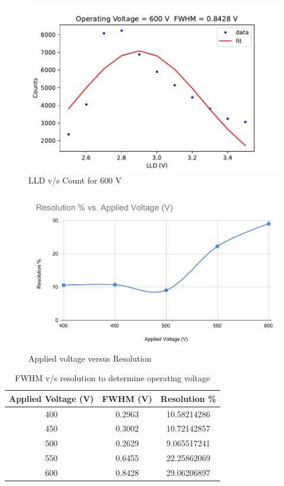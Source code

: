 \documentclass[a4paper, amsfonts, amssymb, amsmath, reprint, showkeys, nofootinbib, twoside]{revtex4-1}
\begin{document}
\begin{figure}[H]
	\centering
	\includegraphics[scale=0.6]{5}
	\caption{LLD v/s Count for 600 V}
\end{figure}

\begin{figure}[H]
	\centering
	\includegraphics[scale=0.45]{6}
	\caption{Applied voltage versus Resolution}
\end{figure}

\begin{table}[H]
	\centering
	\caption{FWHM v/s resolution to determine operating voltage}
	\label{t1}
		\begin{tabular}{|c|c|c|}
			\hline
			Applied Voltage (V) & FWHM (V) & Resolution \% \\ \hline
			400                 & 0.2963   & 10.58214286   \\ \hline
			450                 & 0.3002   & 10.72142857   \\ \hline
			500                 & 0.2629   & 9.065517241   \\ \hline
			550                 & 0.6455   & 22.25862069   \\ \hline
			600                 & 0.8428   & 29.06206897   \\ \hline
		\end{tabular}
\end{table}
\end{document}

